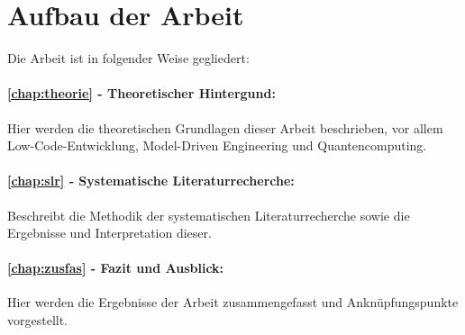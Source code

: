 

\newpage
\section*{Aufbau der Arbeit}

Die Arbeit ist in folgender Weise gegliedert:
\paragraph{\cref{chap:theorie} - Theoretischer Hintergund:} Hier werden die theoretischen Grundlagen dieser Arbeit beschrieben, vor 
allem Low-Code-Entwicklung, Model-Driven Engineering und Quantencomputing.
\paragraph{\cref{chap:slr} - Systematische Literaturrecherche:} Beschreibt die Methodik der systematischen Literaturrecherche sowie die Ergebnisse 
und Interpretation dieser.
\paragraph{\cref{chap:zusfas} - Fazit und Ausblick:} Hier werden die Ergebnisse der Arbeit zusammengefasst und Anknüpfungspunkte vorgestellt.
